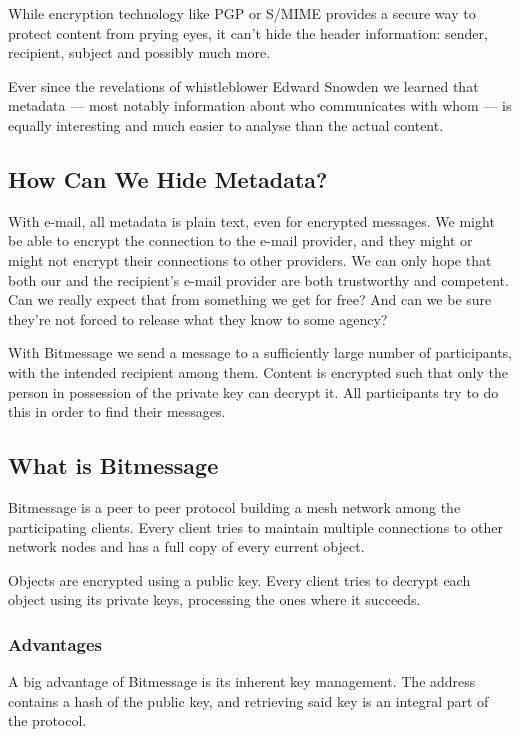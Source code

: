 \documentclass{bfh}
\begin{document}
  While encryption technology like \ac{PGP} or \acs{S/MIME} provides a secure way to protect content from prying eyes, it can't hide the header information: sender, recipient, subject and possibly much more.

  Ever since the revelations of whistleblower Edward Snowden we learned that metadata --- most notably information about who communicates with whom --- is equally interesting and much easier to analyse than the actual content.\cite{guardian:metadata}

  \subsection{How Can We Hide Metadata?}

  With e-mail, all metadata is plain text, even for encrypted messages. We might be able to encrypt the connection to the e-mail provider, and they might or might not encrypt their connections to other providers. We can only hope that both our and the recipient's e-mail provider are both trustworthy and competent. Can we really expect that from something we get for free? And can we be sure they're not forced to release what they know to some agency?\cite{yale:nsl}

  With Bitmessage we send a message to a sufficiently large number of participants, with the intended recipient among them. Content is encrypted such that only the person in possession of the private key can decrypt it. All participants try to do this in order to find their messages.

  \subsection{What is Bitmessage}
  
  Bitmessage is a peer to peer protocol building a mesh network among the participating clients. Every client tries to maintain multiple connections to other network nodes and has a full copy of every current object.
  
  Objects are encrypted using a public key. Every client tries to decrypt each object using its private keys, processing the ones where it succeeds.

  \subsubsection{Advantages}
  A big advantage of Bitmessage is its inherent key management. The address contains a hash of the public key, and retrieving said key is an integral part of the protocol.
\end{document}
